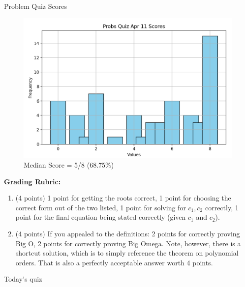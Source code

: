 \documentclass[10pt]{beamer}
\begin{document}
\begin{frame}{Problem Quiz Scores}
\footnotesize 
\begin{figure}[ht]
        \centering
        \includegraphics[width=.5\textwidth]{images/problem_quiz_scores}
   		 \caption{Median Score = 5/8 (68.75\%)}
\end{figure}
\vfill 
\textbf{Grading Rubric:}  
\begin{enumerate}
\item (4 points) 1 point for getting the roots correct, 1 point for choosing the correct form out of the two listed, 1 point for solving for $c_1, c_2$ correctly, 1 point for the final equation being stated correctly (given $c_1$ and $c_2$).
\item (4 points) If you appealed to the definitions:  2 points for correctly proving Big O, 2 points for correctly proving Big Omega.  Note, however, there is a shortcut solution, which is to simply reference the theorem on polynomial orders. That is also a perfectly acceptable answer worth 4 points.
\end{enumerate}



\end{frame}	


\begin{frame}[standout]
Today's quiz
\end{frame}
\end{document}
